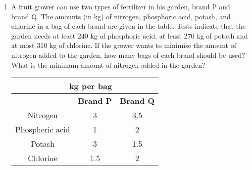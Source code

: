\begin{enumerate}[label=\arabic*.,ref=\thesection.\theenumi]
\begin{tabular}{|c|c|c|}
\end{tabular}\\

Assuming that the transportation cost of 10 litres of oil is Re 1 per km, how
should the delivery be scheduled in order that the transportation cost is minimum?
What is the minimum cost?\\
\item A fruit grower can use two types of fertilizer in his garden, brand P and brand Q.
The amounts (in kg) of nitrogen, phosphoric acid, potash, and chlorine in a bag of
each brand are given in the table. Tests indicate that the garden needs at least
240 kg of phosphoric acid, at least 270 kg of potash and at most 310 kg of
chlorine.
If the grower wants to minimise the amount of nitrogen added to the garden,
how many bags of each brand should be used? What is the minimum amount of
nitrogen added in the garden?\\
\begin{tabular}{|c|c|c|}
\hline
 \multicolumn{2}{|r}{\textbf{ kg per bag}}& \\ \cline{1-3}
\hline
&\textbf{Brand P}&\textbf{Brand Q}\\
\hline
Nitrogen&3&3.5\\
\hline
Phospheric acid&1&2\\
\hline
Potash&3&1.5\\
\hline
Chlorine&1.5&2\\
\hline

\end{tabular}


\end{enumerate}
